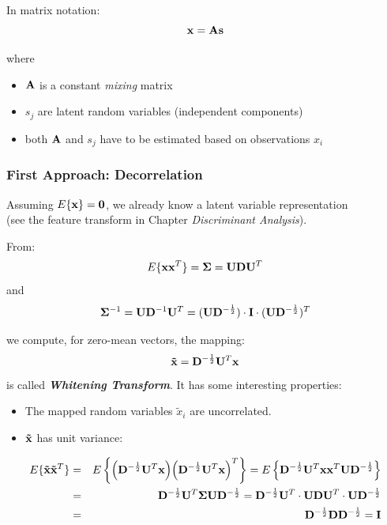   In matrix notation:
  \begin{displaymath}
    \bm{\mathrm{x}} = \mathbf{A} \bm{\mathrm{s}}
  \end{displaymath}

  where
  \begin{itemize}
    \item $\mathbf{A}$ is a constant \textit{mixing} matrix
    \item $s_j$ are latent random variables (independent components)
    \item both $\mathbf{A}$ and $s_j$ have to be estimated based on observations $x_i$
  \end{itemize}
         
 \subsubsection {First Approach: Decorrelation}

  Assuming $E\{\bm{\mathrm{x}}\} = \bm{\mathrm{0}}$, we already know a latent variable representation \\
  (see the feature transform in Chapter \emph{Discriminant Analysis}).

  From:
  \begin{displaymath}
      E\{ \bm{\mathrm{x}} \bm{\mathrm{x}}^T \} = \mathbf{\Sigma} = \mathbf{U} \mathbf{D} \mathbf{U}^T
  \end{displaymath}
  and
  \begin{displaymath}
    \mathbf{\Sigma}^{-1} 
    = \mathbf{U}\mathbf{D}^{-1}\mathbf{U}^T
    = (\mathbf{U}\mathbf{D}^{-\frac{1}{2}})\cdot \mathbf{I} \cdot(\mathbf{U}\mathbf{D}^{-\frac{1}{2}})^T
  \end{displaymath}

  we compute, for zero-mean vectors, the mapping:
  \begin{displaymath}
    \bm{\mathrm{\tilde{x}}} = \mathbf{D}^{-\frac{1}{2}} \mathbf{U}^T \bm{\mathrm{x}}
  \end{displaymath}
  is called \textbf   {\textit{Whitening Transform}}. It has some interesting properties:
  \begin{itemize}
    \item The mapped random variables $\tilde{x}_i$ are uncorrelated.            
    \item $\bm{\mathrm{\tilde{x}}}$ has unit variance:
  \end{itemize}

  \begin{eqnarray*}
     E\{ \bm{\mathrm{\tilde{x}}} \bm{\mathrm{\tilde{x}}}^T \} 
     &=& E\left\{ \Big( \mathbf{D}^{-\frac{1}{2}} \mathbf{U}^T \bm{\mathrm{x}} \Big) \Big( \mathbf{D}^{-\frac{1}{2}} \mathbf{U}^T \bm{\mathrm{x}} \Big)^T \right\}             
     = E\left\{ \mathbf{D}^{-\frac{1}{2}} \mathbf{U}^T \bm{\mathrm{x}} \bm{\mathrm{x}}^T \mathbf{U} \mathbf{D}^{-\frac{1}{2}} \right\} \\             
     &=& \mathbf{D}^{-\frac{1}{2}} \mathbf{U}^T \mathbf{\Sigma} \mathbf{U} \mathbf{D}^{-\frac{1}{2}} = \mathbf{D}^{-\frac{1}{2}} \mathbf{U}^T \cdot \mathbf{U} \mathbf{D} \mathbf{U}^T \cdot \mathbf{U} \mathbf{D}^{-\frac{1}{2}} \\             
     &=& \mathbf{D}^{-\frac{1}{2}} \mathbf{D} \mathbf{D}^{-\frac{1}{2}}             
     = \mathbf{I}
  \end{eqnarray*}
 
